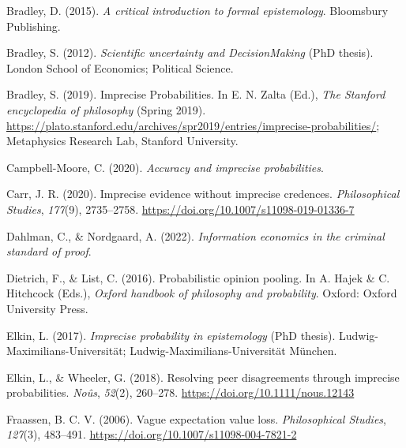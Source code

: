 \documentclass[
  10pt,
  dvipsnames,enabledeprecatedfontcommands]{scrartcl}
\newlength{\cslhangindent}
\newlength{\cslentryspacingunit} %
\newenvironment{CSLReferences}[2] %
 {%
  \setlength{\parindent}{0pt}
  \ifodd #1
  \let\oldpar\par
  \def\par{\hangindent=\cslhangindent\oldpar}
  \fi
  \setlength{\parskip}{#2\cslentryspacingunit}
 }%
 {}
\begin{document}
\hypertarget{refs}{}
\begin{CSLReferences}{1}{0}
\leavevmode{}%
Bradley, D. (2015). \emph{A critical introduction to formal
epistemology}. Bloomsbury Publishing.

\leavevmode{}%
Bradley, S. (2012). \emph{Scientific uncertainty and DecisionMaking}
(PhD thesis). London School of Economics; Political Science.

\leavevmode{}%
Bradley, S. (2019). {Imprecise Probabilities}. In E. N. Zalta (Ed.),
\emph{The {Stanford} encyclopedia of philosophy} ({S}pring 2019).
\url{https://plato.stanford.edu/archives/spr2019/entries/imprecise-probabilities/};
Metaphysics Research Lab, Stanford University.

\leavevmode{}%
Campbell-Moore, C. (2020). \emph{Accuracy and imprecise probabilities}.

\leavevmode{}%
Carr, J. R. (2020). Imprecise evidence without imprecise credences.
\emph{Philosophical Studies}, \emph{177}(9), 2735--2758.
\url{https://doi.org/10.1007/s11098-019-01336-7}

\leavevmode{}%
Dahlman, C., \& Nordgaard, A. (2022). \emph{Information economics in the
criminal standard of proof}.

\leavevmode{}%
Dietrich, F., \& List, C. (2016). Probabilistic opinion pooling. In A.
Hajek \& C. Hitchcock (Eds.), \emph{Oxford handbook of philosophy and
probability}. Oxford: Oxford University Press.

\leavevmode{}%
Elkin, L. (2017). \emph{Imprecise probability in epistemology} (PhD
thesis). Ludwig-Maximilians-Universit{ä}t;
Ludwig-Maximilians-Universität München.

\leavevmode{}%
Elkin, L., \& Wheeler, G. (2018). Resolving peer disagreements through
imprecise probabilities. \emph{Noûs}, \emph{52}(2), 260--278.
\url{https://doi.org/10.1111/nous.12143}

\leavevmode{}%
Fraassen, B. C. V. (2006). Vague expectation value loss.
\emph{Philosophical Studies}, \emph{127}(3), 483--491.
\url{https://doi.org/10.1007/s11098-004-7821-2}


\end{CSLReferences}
\end{document}
